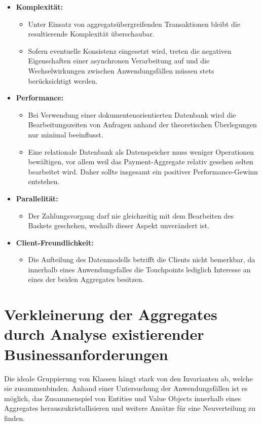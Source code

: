 \begin{itemize}[noitemsep,nolistsep,topsep=-2pt]
	\item \textbf{Komplexität: } {
		\begin{itemize}
			\item {Unter Einsatz von aggregatsübergreifenden Transaktionen bleibt die resultierende Komplexität überschaubar.}
			\item {Sofern eventuelle Konsistenz eingesetzt wird, treten die negativen Eigenschaften einer asynchronen Verarbeitung auf und die Wechselwirkungen zwischen Anwendungsfällen müssen stets berücksichtigt werden.}
		\end{itemize}
	}
	\item \textbf{Performance: } {
		\begin{itemize}
			\item Bei Verwendung einer dokumentenorientierten Datenbank wird die Bearbeitungszeiten von Anfragen anhand der theoretischen Überlegungen nur minimal beeinflusst.
			\item Eine relationale Datenbank als Datenspeicher muss weniger Operationen bewältigen, vor allem weil das Payment-Aggregate relativ gesehen selten bearbeitet wird. Daher sollte insgesamt ein positiver Performance-Gewinn entstehen. 
		\end{itemize}
	}
	\item \textbf{Parallelität: } {
		\begin{itemize}
			\item Der Zahlungsvorgang darf nie gleichzeitig mit dem Bearbeiten des Baskets geschehen, weshalb dieser Aspekt unverändert ist. 
		\end{itemize}	
	}
	\item \textbf{Client-Freundlichkeit: } {
		\begin{itemize}
			\item Die Aufteilung des Datenmodells betrifft die Clients nicht bemerkbar, da innerhalb eines Anwendungsfalles die Touchpoints lediglich Interesse an eines der beiden Aggregates besitzen.
		\end{itemize}
	}
\end{itemize}


\section{Verkleinerung der Aggregates durch Analyse existierender Businessanforderungen}

Die ideale Gruppierung von Klassen hängt stark von den Invarianten ab, welche sie zusammenbinden. Anhand einer Untersuchung der Anwendungsfällen ist es möglich, das Zusammenspiel von Entities und Value Objects innerhalb eines Aggregates herauszukristallisieren und weitere Ansätze für eine Neuverteilung zu finden.

